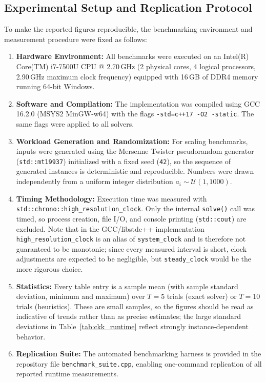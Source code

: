 \documentclass[11pt,a4paper]{article}
\begin{document}
\subsection{Experimental Setup and Replication Protocol}
To make the reported figures reproducible, the benchmarking environment and measurement procedure were fixed as follows:

\begin{enumerate}[label=(\alph*)]
\item \textbf{Hardware Environment:} All benchmarks were executed on an Intel(R) Core(TM) i7-7500U CPU @ 2.70\,GHz (2 physical cores, 4 logical processors, 2.90\,GHz maximum clock frequency) equipped with 16\,GB of DDR4 memory running 64-bit Windows.
\item \textbf{Software and Compilation:} The implementation was compiled using GCC 16.2.0 (MSYS2 MinGW-w64) with the flags \texttt{-std=c++17 -O2 -static}. The same flags were applied to all solvers.
\item \textbf{Workload Generation and Randomization:} For scaling benchmarks, inputs were generated using the Mersenne Twister pseudorandom generator (\texttt{std::mt19937}) initialized with a fixed seed (\texttt{42}), so the sequence of generated instances is deterministic and reproducible. Numbers were drawn independently from a uniform integer distribution $a_i \sim \mathcal{U}(1, 1000)$.
\item \textbf{Timing Methodology:} Execution time was measured with \texttt{std::chrono::high\_resolution\_clock}. Only the internal \texttt{solve()} call was timed, so process creation, file I/O, and console printing (\texttt{std::cout}) are excluded. Note that in the GCC/libstdc++ implementation \texttt{high\_resolution\_clock} is an alias of \texttt{system\_clock} and is therefore not guaranteed to be monotonic; since every measured interval is short, clock adjustments are expected to be negligible, but \texttt{steady\_clock} would be the more rigorous choice.
\item \textbf{Statistics:} Every table entry is a sample mean (with sample standard deviation, minimum and maximum) over $T=5$ trials (exact solver) or $T=10$ trials (heuristics). These are small samples, so the figures should be read as indicative of trends rather than as precise estimates; the large standard deviations in Table~\ref{tab:ckk_runtime} reflect strongly instance-dependent behavior.
\item \textbf{Replication Suite:} The automated benchmarking harness is provided in the repository file \texttt{benchmark\_suite.cpp}, enabling one-command replication of all reported runtime measurements.
\end{enumerate}
\end{document}

